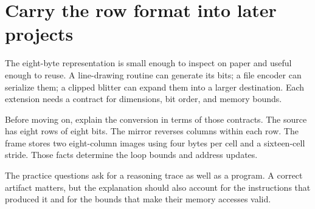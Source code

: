 \section{Carry the row format into later
  projects}\label{003-eight-byte-sprite-p11-carry-the-row-format-into-later-projects}

The eight-byte representation is small enough to inspect on paper and
useful enough to reuse. A line-drawing routine can generate its bits; a
file encoder can serialize them; a clipped blitter can expand them into
a larger destination. Each extension needs a contract for dimensions,
bit order, and memory bounds.

Before moving on, explain the conversion in terms of those contracts.
The source has eight rows of eight bits. The mirror reverses columns
within each row. The frame stores two eight-column images using four
bytes per cell and a sixteen-cell stride. Those facts determine the loop
bounds and address updates.

The practice questions ask for a reasoning trace as well as a program. A
correct artifact matters, but the explanation should also account for
the instructions that produced it and for the bounds that make their
memory accesses valid.
